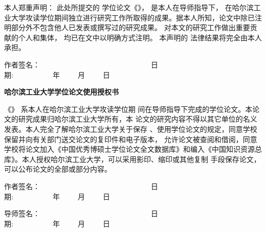 


\iffalse   %
    \newpage

    本人郑重声明： 此处所提交的 \cxuewei 学位论文《\chinesethesistitle》，
    是本人在导师指导下， 在哈尔滨工业大学攻读\cxuewei 学位期间独立进行研究工作所取得的成果。据本人所知，论文中除已注明部分外不包含他人已发表或撰写过的研究成果。
    对本文的研究工作做出重要贡献的个人和集体， 均已在文中以明确方式注明。 本声明的
    法律结果将完全由本人承担。
    \vspace{0.5cm}
    \begin{flushright}{
    作者签名：~~~~~~~~~~~~~~~~~~~~~~~~~~~~~~~日期:~~~~~~~~~~~年~~~~~月~~~~~日}
    \end{flushright}

    \vspace{0.3cm}

{}
    \begin{center}{\xiaoer \hei \bfseries
                    哈尔滨工业大学\cxuewei 学位论文使用授权书}
    \end{center}

    \vspace{0.4cm}

《\chinesethesistitle》 系本人在哈尔滨工业大学攻读\cxuewei 学位期
间在导师指导下完成的\cxuewei 学位论文。本论文的研究成果归哈尔滨工业大学所有，本
论文的研究内容不得以其它单位的名义发表。本人完全了解哈尔滨工业大学关于保存
、使用学位论文的规定，同意学校保留并向有关部门送交论文的复印件和电子版本，
允许论文被查阅和借阅，同意学校将论文加入《中国优秀博硕士学位论文全文数据库》和编入《中国知识资源总库》。本人授权哈尔滨工业大学，可以采用影印、缩印或其他复制
手段保存论文，可以公布论文的全部或部分内容。

\vspace{1.0cm}
\begin{flushright}{
作者签名：~~~~~~~~~~~~~~~~~~~~~~~~~~~~~~~日期:~~~~~~~~~~~年~~~~~月~~~~~日}
\end{flushright}
\vspace{0.2cm}
\begin{flushright}{
导师签名：~~~~~~~~~~~~~~~~~~~~~~~~~~~~~~~日期:~~~~~~~~~~~年~~~~~月~~~~~日}
\end{flushright}

